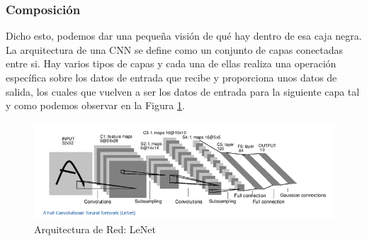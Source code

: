 \documentclass[a4paper,11pt]{book}
\begin{document}
\subsubsection{Composición}
\label{subsub:composicion}
Dicho esto, podemos dar una pequeña visión de qué hay dentro de esa caja negra. La arquitectura de una CNN se define como un conjunto de capas conectadas entre si. Hay varios tipos de capas\cite{cs231n} y cada una de ellas realiza una operación específica sobre los datos de entrada que recibe y proporciona unos datos de salida, los cuales que vuelven a ser los datos de entrada para la siguiente capa tal y como podemos observar en la Figura \ref{fig:LeNet}.
\begin{figure}[h]
\centering
\includegraphics[width=1.0\linewidth]{imagenes/LeNet}
\caption[LeNet]{Arquitectura de Red: LeNet\cite{deshpande16}}
\label{fig:LeNet}
\end{figure}
\end{document}

